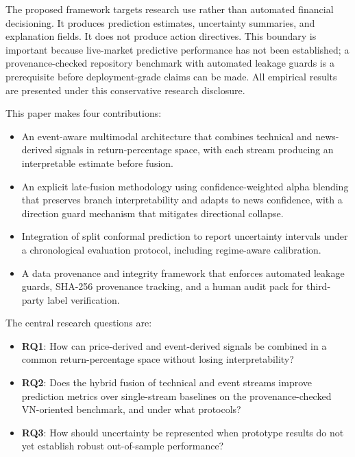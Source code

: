 \documentclass[runningheads]{llncs}
\begin{document}
The proposed framework targets research use rather than automated financial decisioning. It produces prediction estimates, uncertainty summaries, and explanation fields. It does not produce action directives. This boundary is important because live-market predictive performance has not been established; a provenance-checked repository benchmark with automated leakage guards is a prerequisite before deployment-grade claims can be made. All empirical results are presented under this conservative research disclosure.

This paper makes four contributions:
\begin{itemize}
\item An event-aware multimodal architecture that combines technical and news-derived signals in return-percentage space, with each stream producing an interpretable estimate before fusion.
\item An explicit late-fusion methodology using confidence-weighted alpha blending that preserves branch interpretability and adapts to news confidence, with a direction guard mechanism that mitigates directional collapse.
\item Integration of split conformal prediction to report uncertainty intervals under a chronological evaluation protocol, including regime-aware calibration.
\item A data provenance and integrity framework that enforces automated leakage guards, SHA-256 provenance tracking, and a human audit pack for third-party label verification.
\end{itemize}

The central research questions are:
\begin{itemize}
\item \textbf{RQ1}: How can price-derived and event-derived signals be combined in a common return-percentage space without losing interpretability?
\item \textbf{RQ2}: Does the hybrid fusion of technical and event streams improve prediction metrics over single-stream baselines on the provenance-checked VN-oriented benchmark, and under what protocols?
\item \textbf{RQ3}: How should uncertainty be represented when prototype results do not yet establish robust out-of-sample performance?
\end{itemize}

\end{document}
